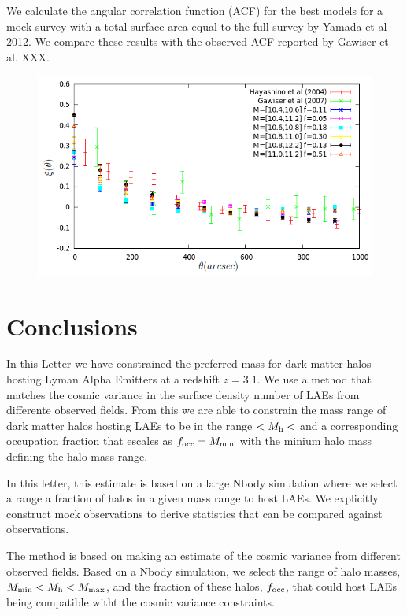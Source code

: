 \documentclass{emulateapj}
\begin{document}
We calculate the angular correlation function (ACF) for the best
models for a mock survey with a total surface area equal to the full
survey by Yamada et al 2012. We compare these results with the
observed ACF reported by Gawiser et al. XXX.  

\begin{figure}
\begin{center}
\includegraphics[width=1.00\linewidth,angle=0]{./plots/correlation_best_models_with_obs_comp.png} 
\end{center} 
\caption{ \label{figure:landscape} 
}
\end{figure}


\section{Conclusions}
In this Letter we have constrained the preferred mass for dark matter
halos hosting Lyman Alpha Emitters at a redshift $z=3.1$. We use a
method that matches the cosmic variance in the surface
density number of LAEs from differente observed fields. From this we
are able to constrain the mass range of dark matter halos hosting LAEs
to be in the range $<M_{\rm h}<$ and a corresponding occupation fraction
that escales as $f_{\rm occ} = M_{\rm min}$ with the minium halo mass
defining the halo mass range.

In this letter, this estimate is based on a large Nbody simulation
where we select a range a fraction of halos in a given mass range to
host LAEs. We explicitly construct mock observations to derive
statistics that can be compared against observations. 

 The method is based on making an estimate of the cosmic
variance from different observed fields. Based on a Nbody simulation,
we select the range of halo masses, $M_{\rm min}<M_{\rm h}<M_{\rm
  max}$, and the fraction of these halos, $f_{\rm occ}$, that could
host LAEs being compatible witht the cosmic variance constraints.
\end{document}
